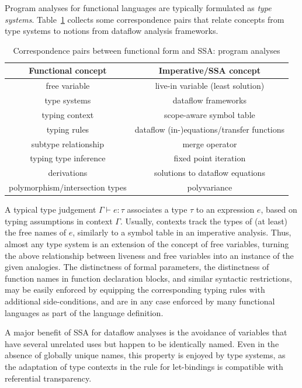{Program analyses for functional languages are typically formulated as
\emph{type systems}. Table~\ref{tableFunctionalCorrespondencesII} collects some
correspondence pairs that relate concepts from type systems to notions
from dataflow analysis frameworks.
\begin{table}
\begin{center}
\begin{tabular}{|c|c|}
  \hline Functional concept & Imperative/SSA concept\\ 
  \hline 
  free variable & live-in variable (least solution)\\
  type systems & dataflow frameworks\\
  typing context & scope-aware symbol table\\
  typing
  rules & dataflow (in-)equations/transfer functions\\
  subtype relationship & merge operator\\
  typing
  type inference & fixed point iteration\\
  derivations & solutions to dataflow equations\\
  polymorphism/intersection types & polyvariance\\
  \hline
\end{tabular}
\end{center}
\caption{\label{tableFunctionalCorrespondencesII}
  Correspondence pairs between functional form and SSA: program analyses}
\end{table}
 A typical type judgement $\Gamma
\vdash e:\tau$ 
associates a type $\tau$ to an expression $e$, based on typing
assumptions in context $\Gamma$. Usually, contexts track the types of
(at least) the free names of $e$, similarly to a symbol table in an
imperative analysis. Thus, almost any type system is an extension of
the concept of free variables, turning the above relationship between
liveness and free variables into an instance of the given
analogies. The distinctness of formal parameters, the distinctness of
function names in function declaration blocks, and similar syntactic
restrictions, may be easily enforced by equipping the corresponding
typing rules with additional side-conditions, and are in any case
enforced by many functional languages as part of the language
definition.

A major benefit of SSA for dataflow analyses is the avoidance of
variables that have several unrelated uses but happen to be
identically named.  Even in the absence of globally unique names, this
property is enjoyed by type systems, as the adaptation of type
contexts in the rule for let-bindings is compatible with referential
transparency.

}

